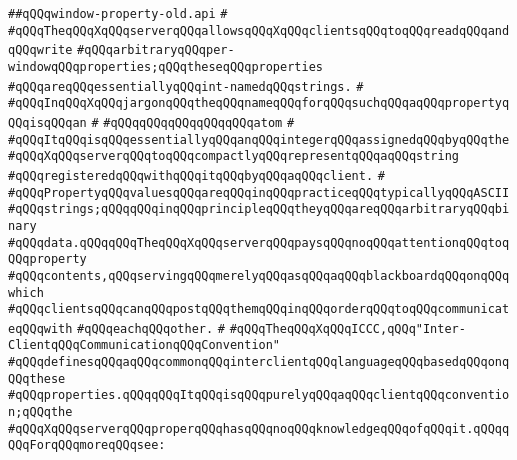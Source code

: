 \label{src/lib/x-kit/xclient/src/iccc/window-property-old.api}
\verb|##qQQqwindow-property-old.api|\newline
\verb|#|\newline
\verb|#qQQqTheqQQqXqQQqserverqQQqallowsqQQqXqQQqclientsqQQqtoqQQqreadqQQqandqQQqwrite|\newline
\verb|#qQQqarbitraryqQQqper-windowqQQqproperties;qQQqtheseqQQqproperties|\newline
\verb|#qQQqareqQQqessentiallyqQQqint-namedqQQqstrings.|\newline
\verb|#|\newline
\verb|#qQQqInqQQqXqQQqjargonqQQqtheqQQqnameqQQqforqQQqsuchqQQqaqQQqpropertyqQQqisqQQqan|\newline
\verb|#|\newline
\verb|#qQQqqQQqqQQqqQQqqQQqatom|\newline
\verb|#|\newline
\verb|#qQQqItqQQqisqQQqessentiallyqQQqanqQQqintegerqQQqassignedqQQqbyqQQqthe|\newline
\verb|#qQQqXqQQqserverqQQqtoqQQqcompactlyqQQqrepresentqQQqaqQQqstring|\newline
\verb|#qQQqregisteredqQQqwithqQQqitqQQqbyqQQqaqQQqclient.|\newline
\verb|#|\newline
\verb|#qQQqPropertyqQQqvaluesqQQqareqQQqinqQQqpracticeqQQqtypicallyqQQqASCII|\newline
\verb|#qQQqstrings;qQQqqQQqinqQQqprincipleqQQqtheyqQQqareqQQqarbitraryqQQqbinary|\newline
\verb|#qQQqdata.qQQqqQQqTheqQQqXqQQqserverqQQqpaysqQQqnoqQQqattentionqQQqtoqQQqproperty|\newline
\verb|#qQQqcontents,qQQqservingqQQqmerelyqQQqasqQQqaqQQqblackboardqQQqonqQQqwhich|\newline
\verb|#qQQqclientsqQQqcanqQQqpostqQQqthemqQQqinqQQqorderqQQqtoqQQqcommunicateqQQqwith|\newline
\verb|#qQQqeachqQQqother.|\newline
\verb|#|\newline
\verb|#qQQqTheqQQqXqQQqICCC,qQQq"Inter-ClientqQQqCommunicationqQQqConvention"|\newline
\verb|#qQQqdefinesqQQqaqQQqcommonqQQqinterclientqQQqlanguageqQQqbasedqQQqonqQQqthese|\newline
\verb|#qQQqproperties.qQQqqQQqItqQQqisqQQqpurelyqQQqaqQQqclientqQQqconvention;qQQqthe|\newline
\verb|#qQQqXqQQqserverqQQqproperqQQqhasqQQqnoqQQqknowledgeqQQqofqQQqit.qQQqqQQqForqQQqmoreqQQqsee:|\newline
